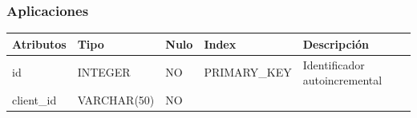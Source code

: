 \documentclass[12pt,a4paperpaper,]{report}
\begin{document}
\subsubsection{Aplicaciones}\label{aplicaciones-1}

\begin{longtable}[]{@{}lllll@{}}
\toprule
\begin{minipage}[b]{0.21\columnwidth}\raggedright\strut
Atributos\strut
\end{minipage} & \begin{minipage}[b]{0.19\columnwidth}\raggedright\strut
Tipo\strut
\end{minipage} & \begin{minipage}[b]{0.16\columnwidth}\raggedright\strut
Nulo\strut
\end{minipage} & \begin{minipage}[b]{0.19\columnwidth}\raggedright\strut
Index\strut
\end{minipage} & \begin{minipage}[b]{0.11\columnwidth}\raggedright\strut
Descripción\strut
\end{minipage}\tabularnewline
\midrule
\endhead
\begin{minipage}[t]{0.21\columnwidth}\raggedright\strut
id\strut
\end{minipage} & \begin{minipage}[t]{0.19\columnwidth}\raggedright\strut
INTEGER\strut
\end{minipage} & \begin{minipage}[t]{0.16\columnwidth}\raggedright\strut
NO\strut
\end{minipage} & \begin{minipage}[t]{0.19\columnwidth}\raggedright\strut
PRIMARY\_KEY\strut
\end{minipage} & \begin{minipage}[t]{0.11\columnwidth}\raggedright\strut
Identificador autoincremental\strut
\end{minipage}\tabularnewline
\begin{minipage}[t]{0.21\columnwidth}\raggedright\strut
client\_id\strut
\end{minipage} & \begin{minipage}[t]{0.19\columnwidth}\raggedright\strut
VARCHAR(50)\strut
\end{minipage} & \begin{minipage}[t]{0.16\columnwidth}\raggedright\strut
NO\strut
\end{minipage} & \begin{minipage}[t]{0.19\columnwidth}\raggedright\strut

\end{minipage}
\end{longtable}
\end{document}
